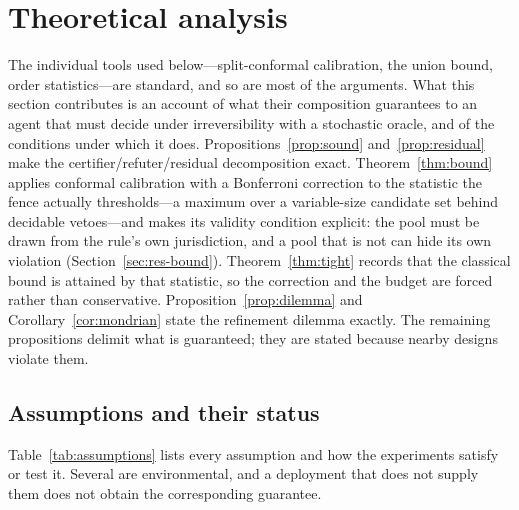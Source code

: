 \section{Theoretical analysis}\label{sec:theory}

The individual tools used below---split-conformal calibration, the union bound, order statistics---are standard, and so are most of the arguments. What this section contributes is an account of what their composition guarantees to an agent that must decide under irreversibility with a stochastic oracle, and of the conditions under which it does. Propositions~\ref{prop:sound} and~\ref{prop:residual} make the certifier/refuter/residual decomposition exact. Theorem~\ref{thm:bound} applies conformal calibration with a Bonferroni correction to the statistic the fence actually thresholds---a maximum over a variable-size candidate set behind decidable vetoes---and makes its validity condition explicit: the pool must be drawn from the rule's own jurisdiction, and a pool that is not can hide its own violation (Section~\ref{sec:res-bound}). Theorem~\ref{thm:tight} records that the classical bound is attained by that statistic, so the correction and the budget are forced rather than conservative. Proposition~\ref{prop:dilemma} and Corollary~\ref{cor:mondrian} state the refinement dilemma exactly. The remaining propositions delimit what is guaranteed; they are stated because nearby designs violate them.

\subsection{Assumptions and their status}\label{sec:assumptions}

Table~\ref{tab:assumptions} lists every assumption and how the experiments satisfy or test it. Several are environmental, and a deployment that does not supply them does not obtain the corresponding guarantee.

